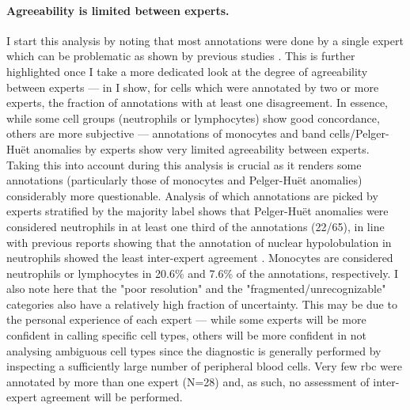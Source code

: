 \begin{figure}[!ht]
    \label{fig:tbca}
\end{figure}

\paragraph{Agreeability is limited between experts.} I start this analysis by noting that most annotations were done by a single expert which can be problematic as shown by previous studies \cite{De_Swart2017-wc,Howe2004-mn,Goasguen2009-dn,Foucar2020-uz}. This is further highlighted once I take a more dedicated look at the degree of agreeability between experts --- in  I show, for cells which were annotated by two or more experts, the fraction of annotations with at least one disagreement. In essence, while some cell groups (neutrophils or lymphocytes) show good concordance, others are more subjective --- annotations of monocytes and band cells/Pelger-Huët anomalies by experts show very limited agreeability between experts. Taking this into account during this analysis is crucial as it renders some annotations (particularly those of monocytes and Pelger-Huët anomalies) considerably more questionable. Analysis of which annotations are picked by experts stratified by the majority label shows that Pelger-Huët anomalies were considered neutrophils in at least one third of the annotations (22/65), in line with previous reports showing that the annotation of nuclear hypolobulation in neutrophils showed the least inter-expert agreement \cite{Weinberg2015-ra}. Monocytes are considered neutrophils or lymphocytes in 20.6\% and 7.6\% of the annotations, respectively. I also note here that the "poor resolution" and the "fragmented/unrecognizable" categories also have a relatively high fraction of uncertainty. This may be due to the personal experience of each expert --- while some experts will be more confident in calling specific cell types, others will be more confident in not analysing ambiguous cell types since the diagnostic is generally performed by inspecting a sufficiently large number of peripheral blood cells. Very few \ac{rbc} were annotated by more than one expert (N=28) and, as such, no assessment of inter-expert agreement will be performed.

\begin{figure}[!ht]
    \label{fig:mile-vice-annotated-cells-wbc-concordance}
\end{figure}

